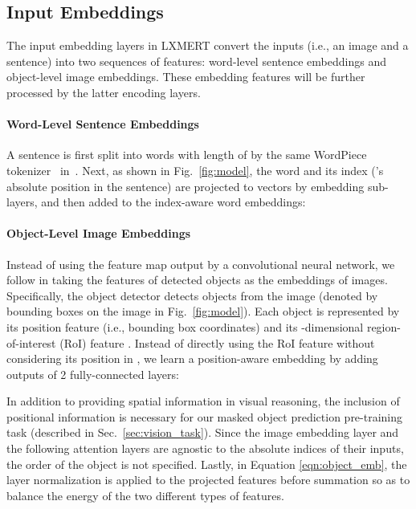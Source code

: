 \documentclass[11pt,a4paper]{article}
\begin{document}
\subsection{Input Embeddings}
\label{sec:input}
The input embedding layers in LXMERT convert the inputs (i.e., an image and a sentence) into two sequences of features: word-level sentence embeddings and object-level image embeddings.
These embedding features will be further processed by the latter encoding layers.
\paragraph{Word-Level Sentence Embeddings}
\label{sec:word_emb}
A sentence is first split into words  with length of  by the same WordPiece tokenizer~\cite{wu2016google} in~.
Next, as shown in Fig.~\ref{fig:model}, the word  and its index  ('s absolute position in the sentence) are projected to vectors by embedding sub-layers, and then added to the index-aware word embeddings:


\paragraph{Object-Level Image Embeddings}
\label{sec:obj_emb}
Instead of using the feature map output by a convolutional neural network, we follow  in taking the features of detected objects as the embeddings of images.
Specifically, the object detector detects  objects  from the image (denoted by bounding boxes on the image in Fig.~\ref{fig:model}).
Each object  is represented by its position feature (i.e., bounding box coordinates)  and its -dimensional region-of-interest (RoI) feature .
Instead of directly using the RoI feature  without considering its position 
in , we learn a position-aware embedding  by adding outputs of 2 fully-connected layers:

In addition to providing spatial information in visual reasoning, 
the inclusion of positional information is necessary for our masked object prediction pre-training task (described in Sec.~\ref{sec:vision_task}).
Since the image embedding layer and the following attention layers are agnostic to the absolute indices of their inputs, the order of the object is not specified.
Lastly, in Equation \ref{eqn:object_emb}, the layer normalization is applied to the projected features before summation so as to balance the energy of the two different types of features.
\end{document}
